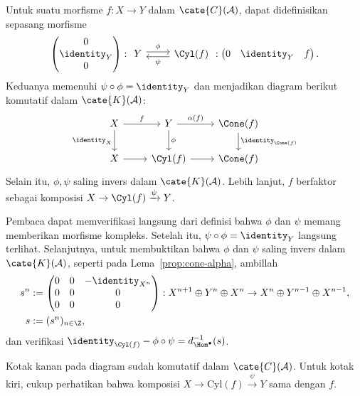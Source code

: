 \begin{lema}\label{prop:cone-beta}
	Untuk suatu morfisme $f:X\to Y$ dalam $\cate{C}(\mathcal{A})$, dapat
	didefinisikan sepasang morfisme
	\[ \begin{pmatrix} 0 \\ \identity_Y \\ 0 \end{pmatrix} : \begin{tikzcd} Y \arrow[r, shift left, "\phi"] & \Cyl(f) \arrow[l, shift left, "\psi"] \end{tikzcd} : \begin{pmatrix} 0 & \identity_Y & f \end{pmatrix}. \]
	Keduanya memenuhi $\psi\circ\phi=\identity_Y$ dan menjadikan diagram
	berikut komutatif dalam $\cate{K}(\mathcal{A})$:
	\[\begin{tikzcd}
		X \arrow[d, "{\identity_X}"'] \arrow[r, "f"] & Y \arrow[d, "\phi"] \arrow[r, "{\alpha(f)}"] & \Cone(f) \arrow[d, "{\identity_{\Cone(f)}}"] \\
		X \arrow[r] & \Cyl(f) \arrow[r] & \Cone(f)
	\end{tikzcd}\]
	Selain itu, $\phi,\psi$ saling invers dalam $\cate{K}(\mathcal{A})$.
Lebih lanjut, $f$ berfaktor sebagai komposisi
$X\to\Cyl(f)\xrightarrow{\psi}Y$.
\end{lema}
\begin{bukti}
	Pembaca dapat memverifikasi langsung dari definisi bahwa $\phi$ dan $\psi$
	memang memberikan morfisme kompleks. Setelah itu,
	$\psi\circ\phi=\identity_Y$ langsung terlihat. Selanjutnya, untuk
	membuktikan bahwa $\phi$ dan $\psi$ saling invers dalam
	$\cate{K}(\mathcal{A})$, seperti pada Lema~\ref{prop:cone-alpha}, ambillah
	\begin{align*}
		s^n & := \begin{pmatrix} 0 & 0 & -\identity_{X^n} \\ 0 & 0 & 0 \\ 0 & 0 & 0 \end{pmatrix}: X^{n+1} \oplus Y^n \oplus X^n \to X^n \oplus Y^{n-1} \oplus X^{n-1}, \\
		s & := (s^n)_{n \in \Z},
	\end{align*}
	dan verifikasi
	$\identity_{\Cyl(f)}-\phi\circ\psi=d^{-1}_{\Hom^\bullet}(s)$.

	Kotak kanan pada diagram sudah komutatif dalam $\cate{C}(\mathcal{A})$.
	Untuk kotak kiri, cukup perhatikan bahwa komposisi
	$X\to\mathrm{Cyl}(f)\xrightarrow{\psi}Y$ sama dengan $f$.
\end{bukti}

